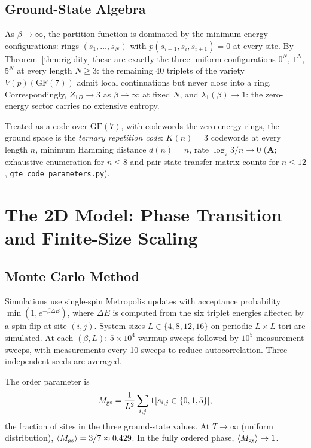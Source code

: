 \documentclass[11pt]{article}
\theoremstyle{remark}
\newcommand{\GF}[1]{\ensuremath{\mathrm{GF}(#1)}}
\newcommand{\CatA}{\textbf{A}}
\begin{document}
\subsection{Ground-State Algebra}

As $\beta \to \infty$, the partition function is dominated by the minimum-energy
configurations: rings $(s_1, \ldots, s_N)$ with $p(s_{i-1}, s_i, s_{i+1}) = 0$
at every site. By Theorem~\ref{thm:rigidity} these are exactly the three uniform
configurations $0^N$, $1^N$, $5^N$ at every length $N \ge 3$: the remaining 40
triplets of the variety $V(p)(\GF{7})$ admit local continuations but never close
into a ring. Correspondingly, $Z_{1D} \to 3$ as $\beta \to \infty$ at fixed $N$,
and $\lambda_1(\beta) \to 1$: the zero-energy sector carries no extensive
entropy.

Treated as a code over $\GF{7}$, with codewords the zero-energy rings, the
ground space is the \emph{ternary repetition code}: $K(n) = 3$ codewords at
every length $n$, minimum Hamming distance $d(n) = n$, rate
$\log_7 3 / n \to 0$ (\CatA{}; exhaustive enumeration for $n \le 8$ and
pair-state transfer-matrix counts for $n \le 12$,
\texttt{gte\_code\_parameters.py}).

\section{The 2D Model: Phase Transition and Finite-Size Scaling}
\label{sec:2D}

\subsection{Monte Carlo Method}

Simulations use single-spin Metropolis updates with acceptance probability
$\min(1, e^{-\beta \Delta E})$, where $\Delta E$ is computed from the six triplet
energies affected by a spin flip at site $(i,j)$. System sizes $L \in \{4, 8, 12, 16\}$
on periodic $L \times L$ tori are simulated. At each $(\beta, L)$: $5 \times 10^4$ warmup
sweeps followed by $10^5$ measurement sweeps, with measurements every 10 sweeps
to reduce autocorrelation. Three independent seeds are averaged.

The order parameter is
\begin{equation}
  M_{\rm gs} = \frac{1}{L^2}\sum_{i,j} \mathbf{1}[s_{i,j} \in \{0,1,5\}],
\end{equation}
the fraction of sites in the three ground-state values. At $T \to \infty$
(uniform distribution), $\langle M_{\rm gs} \rangle = 3/7 \approx 0.429$.
In the fully ordered phase, $\langle M_{\rm gs} \rangle \to 1$.
\end{document}
